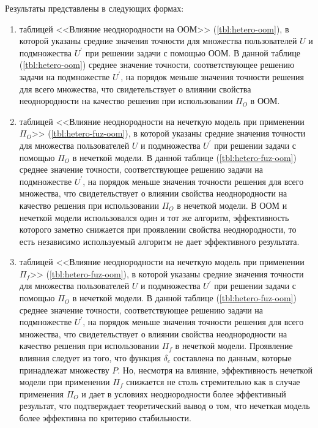 Результаты представлены в следующих формах:
\begin{enumerate}
	\item таблицей <<Влияние неоднородности на ООМ>> (\ref{tbl:hetero-oom}), в которой указаны
	средние значения точности для множества пользователей $U$ и подмножества
	$U^{\prime}$ при решении задачи с помощью ООМ.
	В данной таблице (\ref{tbl:hetero-oom}) среднее значение точности, соответствующее
	решению задачи на подмножестве $U^{\prime}$, на порядок
	меньше значения точности решения для всего множества,
	что свидетельствует о влиянии свойства неоднородности на качество
	решения при использовании $\Pi_O$ в ООМ.

	\item таблицей <<Влияние неоднородности на нечеткую модель при применении $\Pi_O$>> (\ref{tbl:hetero-fuz-oom}), в которой указаны
	средние значения точности для множества пользователей $U$ и подмножества
	$U^{\prime}$ при решении задачи с помощью $\Pi_O$ в нечеткой модели.
	В данной таблице (\ref{tbl:hetero-fuz-oom}) среднее значение точности, соответствующее
	решению задачи на подмножестве $U^{\prime}$, на порядок
	меньше значения точности решения для всего множества,
	что свидетельствует о влиянии свойства неоднородности на качество решения
	при использовании $\Pi_O$ в нечеткой модели. В ООМ и нечеткой модели
	использовался один и тот же алгоритм, эффективность которого заметно
	снижается при проявлении свойства неоднородности, то есть независимо
	используемый алгоритм не дает эффективного результата.

	\item таблицей <<Влияние неоднородности на нечеткую модель при применении $\Pi_f$>> (\ref{tbl:hetero-fuz-oom}), в которой указаны
	средние значения точности для множества пользователей $U$ и подмножества
	$U^{\prime}$ при решении задачи с помощью $\Pi_O$ в нечеткой модели.
	В данной таблице (\ref{tbl:hetero-fuz-oom}) среднее значение точности, соответствующее
	решению задачи на подмножестве $U^{\prime}$, на порядок
	меньше значения точности решения для всего множества,
	что свидетельствует о влиянии свойства неоднородности на качество решения
	при использовании $\Pi_f$ в нечеткой модели. Проявление влияния следует из
	того, что функция $\delta_c$ составлена по данным, которые принадлежат
	множеству $P$. Но, несмотря на влияние, эффективность нечеткой модели
	при применении $\Pi_f$
	снижается не столь стремительно как в случае применения $\Pi_O$
	и дает в условиях неоднородности более эффективный результат,
	что подтверждает теоретический вывод о том, что нечеткая
	модель более эффективна по критерию стабильности.
\end{enumerate}

